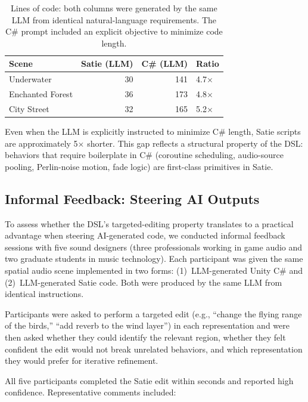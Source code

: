 \documentclass[sigconf,anonymous,review]{nimeart}
\begin{document}
\begin{table}[htbp]
\caption{Lines of code: both columns were generated by the same LLM from identical natural-language requirements. The C\# prompt included an explicit objective to minimize code length.}
\label{tab:loc}
\begin{tabular}{lrrl}
\toprule
\textbf{Scene} & \textbf{Satie (LLM)} & \textbf{C\# (LLM)} & \textbf{Ratio} \\
\midrule
Underwater & 30 & 141 & 4.7$\times$ \\
Enchanted Forest & 36 & 173 & 4.8$\times$ \\
City Street & 32 & 165 & 5.2$\times$ \\
\bottomrule
\end{tabular}
\end{table}

Even when the LLM is explicitly instructed to minimize C\# length, Satie scripts are approximately 5$\times$ shorter. This gap reflects a structural property of the DSL: behaviors that require boilerplate in C\# (coroutine scheduling, audio-source pooling, Perlin-noise motion, fade logic) are first-class primitives in Satie.

\subsection{Informal Feedback: Steering AI Outputs}

To assess whether the DSL's targeted-editing property translates to a practical advantage when steering AI-generated code, we conducted informal feedback sessions with five sound designers (three professionals working in game audio and two graduate students in music technology). Each participant was given the same spatial audio scene implemented in two forms: (1)~LLM-generated Unity C\# and (2)~LLM-generated Satie code. Both were produced by the same LLM from identical instructions.

Participants were asked to perform a targeted edit (e.g., ``change the flying range of the birds,'' ``add reverb to the wind layer'') in each representation and were then asked whether they could identify the relevant region, whether they felt confident the edit would not break unrelated behaviors, and which representation they would prefer for iterative refinement.

All five participants completed the Satie edit within seconds and reported high confidence. Representative comments included:
\end{document}
